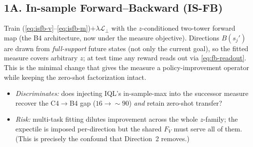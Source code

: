 \documentclass[11pt]{article}
\newcommand{\Fmap}{F}                                %
\newcommand{\Bmap}{B}                                %
\begin{document}
\subsection*{1A. In-sample Forward--Backward (IS-FB)}
Train (\ref{eq:isfb-v}--\ref{eq:isfb-m})$+\lambda\mathcal{L}_{\perp}$ with the
$z$-conditioned two-tower forward map (the B4 architecture, now under the measure
objective). Directions $\Bmap(s_j')$ are drawn from \emph{full-support} future
states (not only the current goal), so the fitted measure covers arbitrary $z$;
at test time any reward reads out via \eqref{eq:fb-readout}. This is the minimal
change that gives the measure a policy-improvement operator while keeping the
zero-shot factorization intact.
\begin{itemize}[leftmargin=1.4em,itemsep=1pt]
  \item \emph{Discriminates:} does injecting IQL's in-sample-max into the
        successor measure recover the C4$\to$B4 gap ($16\to{\sim}90$) \emph{and}
        retain zero-shot transfer?
  \item \emph{Risk:} multi-task fitting dilutes improvement across the whole
        $z$-family; the expectile is imposed per-direction but the shared
        $\Fmap_V$ must serve all of them. (This is precisely the confound that
        Direction~2 removes.)
\end{itemize}
\end{document}
